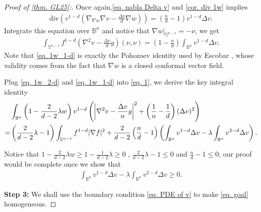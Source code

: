 \documentclass[12pt]{amsart}
\numberwithin{equation}{section}
\numberwithin{lemma}{section}
\numberwithin{proposition}{section}
\numberwithin{corollary}{section}
\numberwithin{remark}{section}
\begin{document}
\begin{proof}[Proof of \cref{thm. GL25}:]
    Once again,\cref{eq. nabla Delta v} and \cref{cor. div 1w} implies
    \begin{align*}
        \mathrm{div}\left(
        v^{1-d}
        \left(\nabla_{\nabla w}\nabla v-\frac{\Delta v}{d}\nabla w\right)
        \right)
        =\left(\frac{n}{d}-1\right)v^{1-d}\Delta v.
    \end{align*}
    Integrate this equation over $\mathbb{B}^n$ and notice that $\nabla w|_{\mathbb{S}^{n-1}}=-\nu$, we get
    \begin{align}\label{eq. 1w_1-d}
        \int_{\mathbb{S}^{n-1}}f^{1-d}
        \left(\nabla^2 v-\frac{\Delta v}{d}g\right)(\nu,\nu)
        =\left(1-\frac{n}{d}\right)
        \int_{\mathbb{B}^n}v^{1-d}\Delta v.
    \end{align}
    Note that \cref{eq. 1w_1-d} is exactly the Pohozaev identity \cite[Proposition 1.4]{Sch88} used by Escobar \cite{Esc90}, whose validity comes from the fact that $\nabla w$ is a closed conformal vector field.
    

    Plug \cref{eq. 1w_2-d} and \cref{eq. 1w_1-d} into \cref{eq. 1}, we derive the key integral identity
    \begin{align*}
        &\int_{\mathbb{B}^n}
        \left(1-\frac{2}{d-2}\lambda w\right)
        v^{1-d}\left(
        \left|\nabla^2 v-\frac{\Delta v}{n}g\right|^2
        +\left(\frac{1}{n}-\frac{1}{d}\right)(\Delta v)^2
        \right)\notag\\
        =&\left(\frac{2}{d-2}\lambda-1\right)
        \int_{\mathbb{S}^{n-1}}f^{1-d}|\nabla f|^2
        +\frac{2}{d-2}
        \left(\frac{n}{d}-1\right)\left(
        \int_{\mathbb{B}^n}v^{1-d}\Delta v-\lambda \int_{\mathbb{B}^n}v^{2-d}\Delta v
        \right).
    \end{align*}

    Notice that $1-\frac{2}{d-2}\lambda w\geq1-\frac{1}{d-2}\lambda\geq 0$ , $\frac{2}{d-2}\lambda-1\leq 0$ and $\frac{n}{d}-1\leq 0$, our proof would be complete once we show that
    \begin{align}\label{eq. goal}
        \int_{\mathbb{B}^n}v^{1-d}\Delta v-\lambda \int_{\mathbb{B}^n}v^{2-d}\Delta v\geq 0.
    \end{align}

    \textbf{Step 3:} We shall use the boundary condition \cref{eq. PDE of v} to make \cref{eq. goal} homogeneous.
    

\end{proof}
\end{document}
